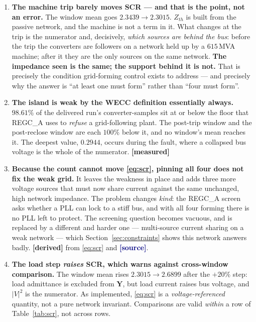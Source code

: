 \documentclass[12pt,a4paper]{article}
\theoremstyle{remark}
\newcommand{\measured}{\textcolor{ok}{\textbf{[measured]}}}
\newcommand{\derived}{\textcolor{warn}{\textbf{[derived]}}}
\newcommand{\sourcecode}{\textcolor{navy}{\textbf{[source]}}}
\begin{document}
\begin{enumerate}[leftmargin=1.7em,itemsep=3pt]
\item \textbf{The machine trip barely moves SCR --- and that is the point, not
      an error.} The window mean goes $2.3439 \to 2.3015$. $Z_{th}$ is built
      from the passive network, and the machine is not a term in it. What changes
      at the trip is the numerator and, decisively, \emph{which sources are
      behind the bus}: before the trip the converters are followers on a network
      held up by a $615$\,MVA machine; after it they are the only sources on the
      same network. \textbf{The impedance seen is the same; the support behind it
      is not.} That is precisely the condition grid-forming control exists to
      address --- and precisely why the answer is ``at least one must form''
      rather than ``four must form''.

\item \textbf{The island is weak by the WECC definition essentially always.}
      $98.61\%$ of the delivered run's converter-samples sit at or below the
      floor that REGC\_A uses to \emph{refuse} a grid-following plant. The
      post-trip window and the post-reclose window are each $100\%$ below it, and
      no window's mean reaches it. The deepest value, $0.2944$, occurs during the
      fault, where a collapsed bus voltage is the whole of the numerator.
      \measured

\item \textbf{Because the count cannot move \eqref{eq:scr}, pinning all four
      does not fix the weak grid.} It leaves the weakness in place and adds three
      more voltage sources that must now share current against the same
      unchanged, high network impedance. The problem changes \emph{kind}: the
      REGC\_A screen asks whether a PLL can lock to a stiff bus, and with all
      four forming there is no PLL left to protect. The screening question
      becomes vacuous, and is replaced by a different and harder one ---
      multi-source current sharing on a weak network --- which
      Section~\ref{sec:constraints} shows this network answers badly.
      \derived{} from \eqref{eq:scr} and \sourcecode.

\item \textbf{The load step \emph{raises} SCR, which warns against cross-window
      comparison.} The window mean rises $2.3015 \to 2.6899$ after the $+20\%$
      step: load admittance is excluded from $\mathbf{Y}$, but load current
      raises bus voltage, and $|V|^2$ is the numerator. As implemented,
      \eqref{eq:scr} is a \emph{voltage-referenced} quantity, not a pure network
      invariant. Comparisons are valid \emph{within} a row of
      Table~\ref{tab:scr}, not across rows.
\end{enumerate}
\end{document}
